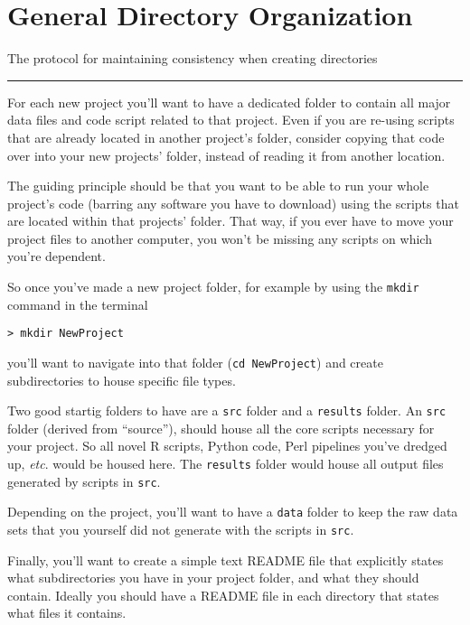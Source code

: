 \documentclass[
  letterpaper,
  DIV=11,
  numbers=noendperiod]{scrreprt}
\begin{document}
\hypertarget{general-directory-organization}{%
\chapter{General Directory
Organization}\label{general-directory-organization}}

The protocol for maintaining consistency when creating directories

\begin{center}\rule{0.5\linewidth}{0.5pt}\end{center}

For each new project you'll want to have a dedicated folder to contain
all major data files and code script related to that project. Even if
you are re-using scripts that are already located in another project's
folder, consider copying that code over into your new projects' folder,
instead of reading it from another location.

The guiding principle should be that you want to be able to run your
whole project's code (barring any software you have to download) using
the scripts that are located within that projects' folder. That way, if
you ever have to move your project files to another computer, you won't
be missing any scripts on which you're dependent.

So once you've made a new project folder, for example by using the
\texttt{mkdir} command in the terminal

\begin{verbatim}
> mkdir NewProject
\end{verbatim}

you'll want to navigate into that folder (\texttt{cd\ NewProject}) and
create subdirectories to house specific file types.

Two good startig folders to have are a \texttt{src} folder and a
\texttt{results} folder. An \texttt{src} folder (derived from
``source''), should house all the core scripts necessary for your
project. So all novel R scripts, Python code, Perl pipelines you've
dredged up, \emph{etc}. would be housed here. The \texttt{results}
folder would house all output files generated by scripts in
\texttt{src}.

Depending on the project, you'll want to have a \texttt{data} folder to
keep the raw data sets that you yourself did not generate with the
scripts in \texttt{src}.

Finally, you'll want to create a simple text README file that explicitly
states what subdirectories you have in your project folder, and what
they should contain. Ideally you should have a README file in each
directory that states what files it contains.
\end{document}
